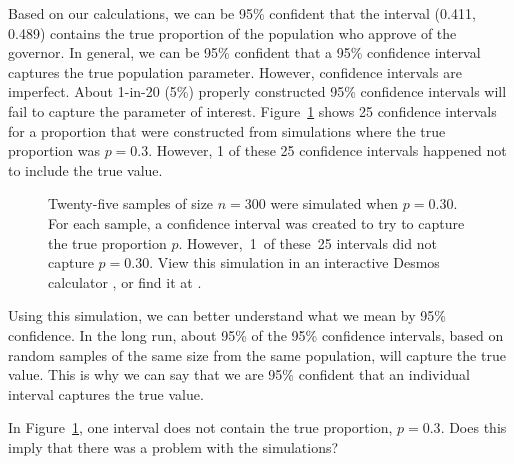 \D{\newpage}

Based on our calculations, we can be 95\% confident that the interval (0.411, 0.489) contains the true proportion of the population who approve of the governor. In general, we can be 95\% confident that a 95\% confidence interval captures the true population parameter. However, confidence intervals are imperfect. About 1-in-20 (5\%) properly constructed 95\% confidence intervals will fail to capture the parameter of interest. Figure~\ref{95PercentConfidenceInterval} shows 25 confidence intervals for a proportion that were constructed from simulations where the true proportion was $p = 0.3$. However, 1 of these 25 confidence intervals happened not to include the true value.

\begin{figure}[h]
\centering
\caption{Twenty-five samples of size $n=300$ were simulated when $p = 0.30$. For each sample, a confidence interval was created to try to capture the true proportion $p$. However,~1~of these~25 intervals did not capture $p = 0.30$.  View this simulation in an interactive Desmos calculator , or find it at .}
\label{95PercentConfidenceInterval}
\end{figure}

Using this simulation, we can better understand what we mean by 95\% confidence.  In the long run, about 95\% of the 95\% confidence intervals, based on random samples of the same size from the same population, will capture the true value.  This is why we can say that we are 95\% confident that an individual interval captures the true value.

\begin{exercisewrap}
\begin{nexercise}
In Figure~\ref{95PercentConfidenceInterval}, one interval does not contain the true proportion, $p = 0.3$. Does this imply that there was a problem with the simulations?\footnotemark
\end{nexercise}
\end{exercisewrap}

